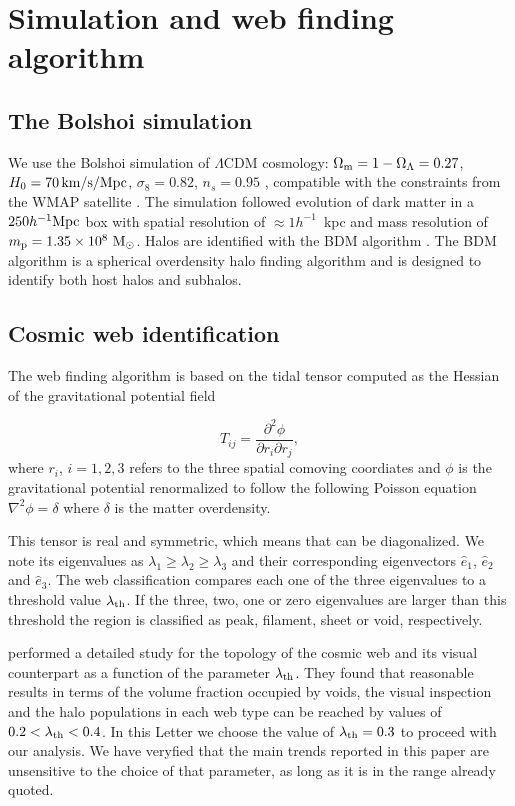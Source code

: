 \documentclass{emulateapj}
\newcommand{\hmpc}{{\ifmmode{h^{-1}{\rm Mpc}}\else{$h^{-1}$Mpc }\fi}}
\begin{document}
\section{Simulation and web finding algorithm}
\label{sec:simulation}

\subsection{The Bolshoi simulation}
We use the Bolshoi simulation of $\Lambda$CDM cosmology: $\Omega_{\rm
  m}=1-\Omega_{\Lambda}=0.27$, $H_0=70\,\rm km/s/Mpc$,
$\sigma_8=0.82$, $n_s=0.95$ \citep{2011ApJ...740..102K}, compatible
with the constraints from the WMAP satellite
\citep{hinshaw_etal13}. The simulation followed evolution of dark
matter in a $250 \hmpc$ box with spatial resolution of $\approx
1h^{-1}$~kpc and mass resolution of $m_{\rm p}=1.35\times 10^8\ \rm
M_{\odot}$. Halos are identified with the BDM algorithm
\citep{1997astro.ph.12217K}. The BDM algorithm is  a spherical
overdensity halo finding algorithm and is designed to identify both
host halos and subhalos. 


\subsection{Cosmic web identification}
The web finding algorithm is based on the tidal tensor computed as the
Hessian of the  gravitational potential field

\begin{equation}
T_{ij} = \frac{\partial^2 \phi}{\partial r_i \partial r_j}, 
\end{equation}
%
where $r_{i}$, $i=1,2,3$ refers to the three spatial comoving
coordiates and $\phi$ is the gravitational potential renormalized to
follow the following Poisson equation $\nabla^2\phi=\delta$ where
$\delta$ is the matter overdensity.  

This tensor is real and symmetric, which means that can be
diagonalized. We note its eigenvalues as $\lambda_1\geq \lambda_2\geq
\lambda_3$ and their corresponding eigenvectors $\hat{e}_1$,
$\hat{e}_2$ and $\hat{e}_3$. The web classification compares each one
of the three eigenvalues to a threshold value $\lambda_{\rm th}$. If
the three, two, one or zero eigenvalues are larger than this threshold
the region is classified as peak, filament, sheet or void,
respectively.  

\cite{Tweb} performed a detailed study for the topology of the
cosmic web and its visual counterpart as a function of the parameter
$\lambda_{\rm th}$. They found that reasonable results in terms of the
volume fraction occupied by voids, the visual inspection and the halo
populations in each web type can be reached by values of $0.2<\lambda_{\rm
th}<0.4$. In this Letter we choose the value of $\lambda_{\rm
  th}=0.3$ to proceed with our analysis. We have veryfied that the
main trends reported in this paper are unsensitive to the choice of
that parameter, as long as it is in the range already quoted.
\end{document}
